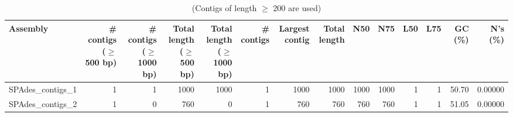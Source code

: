 \begin{table}[ht]
\begin{center}
\caption{(Contigs of length $\geq$ 200 are used)}
\begin{tabular}{|l*{13}{|r}|}
\hline
Assembly & \# contigs ($\geq$ 500 bp) & \# contigs ($\geq$ 1000 bp) & Total length ($\geq$ 500 bp) & Total length ($\geq$ 1000 bp) & \# contigs & Largest contig & Total length & N50 & N75 & L50 & L75 & GC (\%) & N's (\%) \\ \hline
SPAdes\_contigs\_1 & 1 & 1 & 1000 & 1000 & 1 & 1000 & 1000 & 1000 & 1000 & 1 & 1 & 50.70 & 0.00000 \\ \hline
SPAdes\_contigs\_2 & 1 & 0 & 760 & 0 & 1 & 760 & 760 & 760 & 760 & 1 & 1 & 51.05 & 0.00000 \\ \hline
\end{tabular}
\end{center}
\end{table}
